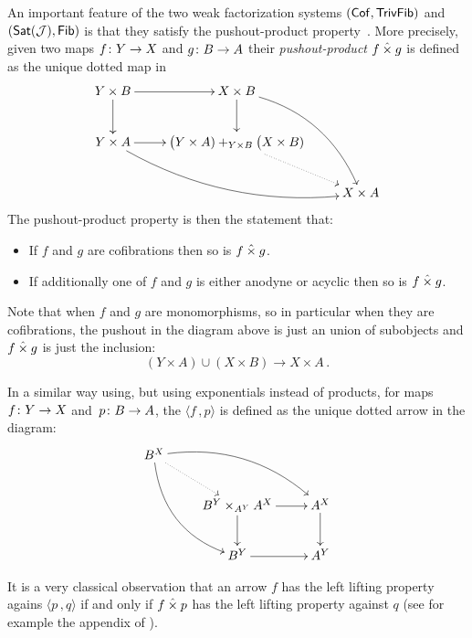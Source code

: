 \documentclass[reqno,10pt,a4paper,oneside,draft]{amsart}
\begin{document}
 
An important feature of the two weak factorization systems $(\mathsf{Cof}, \mathsf{TrivFib})$ and $(\mathsf{Sat}(\mathcal{J}), \mathsf{Fib})$
is that they satisfy the pushout-product property~\cite{henry2018wms}. More precisely, given two maps $f \colon Y \rightarrow X$ and $g \colon B \rightarrow A$ their \emph{pushout-product} $f \mathbin{\hat{\times}} g$ is defined as the unique dotted map in
\[
\xymatrix{
Y \times B \ar[r] \ar[d] &  X \times B \ar[d] \ar@/^1.5pc/[ddr] \\
Y \times A \ar[r]  \ar@/_1.5pc/[drr] & \displaystyle \big( Y \times A ) +_{Y \times B} \big( X \times B ) \ar@{.>}[dr]  \\
 & & X \times A }
 \]
The pushout-product property is then the statement that:

\begin{itemize}
\item If $f$ and $g$ are cofibrations then so is $f \mathbin{\hat{\times}} g$.
\item If additionally one of $f$ and $g$ is either anodyne or acyclic then so is $f \mathbin{\hat{\times}} g$.
\end{itemize}
Note that when $f$ and $g$ are monomorphisms, so in particular when they are cofibrations, the pushout in the diagram above is just an union of subobjects and $f \mathbin{\hat{\times}} g$ is just the inclusion:
\[  
(Y \times A) \cup (X \times B) \rightarrow X \times A \, .
\]






In a similar way using, but using  exponentials instead of products, for maps $f \colon Y \rightarrow X$ and~$p \colon B \rightarrow A$, the   $\langle f \, , p \rangle$ is defined as the unique dotted arrow in the diagram:
\[
\xymatrix{
 B^X \ar@{.>}[dr] \ar@/^1.5pc/[drr] \ar@/_1.5pc/[ddr] \\
& B^Y \times_{A^Y} A^X \ar[r] \ar[d] &  A^X \ar[d]  \\
& B^Y \ar[r] & A^Y  \\
 }
 \]
 
 \medskip
 
It is a very classical observation that an arrow $f$ has the left lifting property agains $\langle p \, , q \rangle$ if and only if $f \mathbin{\hat{\times}} p$ has the left lifting property against $q$ (see for example the appendix of \cite{joyal-tierney-segal}). 

\medskip
\end{document}
